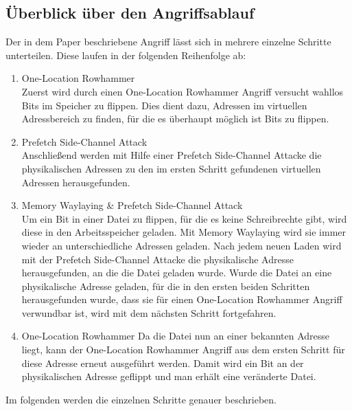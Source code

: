\documentclass[conference]{IEEEtran}
\begin{document}
\subsection{Überblick über den Angriffsablauf}
Der in dem Paper beschriebene Angriff lässt sich in mehrere einzelne Schritte unterteilen. Diese laufen in der folgenden Reihenfolge ab:
\begin{enumerate}
	\item One-Location Rowhammer \\
	Zuerst wird durch einen One-Location Rowhammer Angriff versucht wahllos Bits im Speicher zu flippen. Dies dient dazu, Adressen im virtuellen Adressbereich zu finden, für die es überhaupt möglich ist Bits zu flippen.
	
	\item Prefetch Side-Channel Attack \\
	Anschließend werden mit Hilfe einer Prefetch Side-Channel Attacke die physikalischen Adressen zu den im ersten Schritt gefundenen virtuellen Adressen herausgefunden.
	
	\item Memory Waylaying \& Prefetch Side-Channel Attack \\
	Um ein Bit in einer Datei zu flippen, für die es keine Schreibrechte gibt, wird diese in den Arbeitsspeicher geladen. Mit Memory Waylaying wird sie immer wieder an unterschiedliche Adressen geladen. Nach jedem neuen Laden wird mit der Prefetch Side-Channel Attacke die physikalische Adresse herausgefunden, an die die Datei geladen wurde.
	Wurde die Datei an eine physikalische Adresse geladen, für die in den ersten beiden Schritten herausgefunden wurde, dass sie für einen One-Location Rowhammer Angriff verwundbar ist, wird mit dem nächsten Schritt fortgefahren.
	
	\item One-Location Rowhammer
	Da die Datei nun an einer bekannten Adresse liegt, kann der  One-Location Rowhammer Angriff aus dem ersten Schritt für diese Adresse erneut ausgeführt werden. Damit wird ein Bit an der physikalischen Adresse geflippt und man erhält eine veränderte Datei.
\end{enumerate}

Im folgenden werden die einzelnen Schritte genauer beschrieben.
\end{document}
